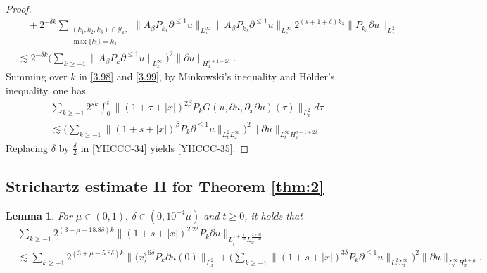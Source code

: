 \documentclass[11pt,twoside]{article}
\def\cY{\mathcal Y}
\def\f{\frac}
\def\p{\partial}
\def\ls{\lesssim}
\newcommand{\w}[1]{\langle {#1} \rangle}
\theoremstyle{plain}
\newtheorem{lemma}[theorem]{Lemma}
\theoremstyle{definition}
\numberwithin{equation}{section}
\begin{document}
\begin{proof}
\begin{equation}
\begin{split}
&\quad+2^{-\delta k}\sum_{\substack{(k_1,k_2,k_3)\in\cY_k, \\ \max\{k_i\}=k_3}} \|A_{\beta}P_{k_1}\p^{\le 1} u\|_{L^\infty_x} \|A_{\beta}P_{k_2}\p^{\le 1} u\|_{L^\infty_x} 2^{(s+1+\delta)k_3}\|P_{k_3}\p u\|_{L^2_x}\\
&\ls
 2^{-\delta k}\big(\sum_{k\ge-1} \|A_{\beta}P_{k}\p^{\le 1} u\|_{L^\infty_x}\big)^2
\|\p u\|_{H^{s+1+2\delta}_x}.
\end{split}
\end{equation}
Summing over $k$ in \eqref{3.98} and \eqref{3.99}, by Minkowski's inequality and H\"older's inequality, one has
\begin{equation}\label{YHCCC-34}
\begin{aligned}
&\sum_{k\ge -1} 2^{sk}\int_{0}^{t}\big\|(1+\tau+|x|)^{2\beta}P_k G(u,\partial u,\p_x\p u)(\tau)\big\|_{L^2_x}d\tau\\
&\ls
\big(\sum_{k\ge -1}\|(1+s+|x|)^{\beta}P_k\p^{\le 1} u\|_{L^{2}_tL^\infty_x}\big)^2
\|\p u\|_{L^\infty_tH^{s+1+2\delta}_x}.
\end{aligned}
\end{equation}
Replacing $\delta$ by $\f\delta2$ in \eqref{YHCCC-34} yields  \eqref{YHCCC-35}.
\end{proof}



\subsection{Strichartz estimate II for Theorem \ref{thm:2}}
\begin{lemma}\label{lem:Estimate of Besov norm 3}
	For $\mu\in(0,1),\ \delta\in(0,10^{-4}\mu)$ and $t\ge0$, it holds that
	\begin{equation}\label{ineq:Estimate of Besov norm 3}
	\begin{split}
	&\sum_{k\ge -1}2^{(3 +\mu -18.8\delta) k}\|(1+s+|x|)^{2.2\delta} P_{k}\p u\|_{L_t^{1+\f{1}{4\delta}}L^{\f{2+8\delta}{1-4\delta}}_x}\\
	&\ls
	\sum_{k\ge -1}2^{(3+\mu -5.8\delta) k}
	\|\w{x}^{6\delta}P_k\partial u(0)\|_{L^2_x}
	+\big(\sum_{k\ge -1}\|(1+s+|x|)^{3\delta}P_{k}\p^{\le 1} u\|_{L^2_tL^\infty_x}\big)^2
	\|\p u\|_{L^\infty_tH^{4+\mu}_x}.
	\end{split}
	\end{equation}
\end{lemma}	
\end{document}
